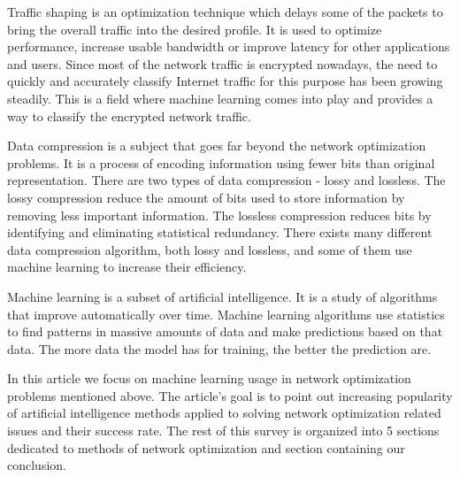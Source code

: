 \documentclass[conference]{IEEEtran}
\begin{document}
Traffic shaping is an optimization technique which delays some of the packets to bring the overall traffic into the desired profile. It is used to optimize performance, increase usable bandwidth or improve latency for other applications and users. Since most of the network traffic is encrypted nowadays, the need to quickly and accurately classify Internet traffic for this purpose has been growing steadily\cite{traffic-classification1}. This is a field where machine learning comes into play and provides a way to classify the encrypted network traffic.\par
Data compression is a subject that goes far beyond the network optimization problems. It is a process of encoding information using fewer bits than original representation. There are two types of data compression - lossy and lossless. The lossy compression reduce the amount of bits used to store information by removing less important information. The lossless compression reduces bits by identifying and eliminating statistical redundancy. There exists many different data compression algorithm, both lossy and lossless, and some of them use machine learning to increase their efficiency\cite{compression1}\cite{compression2}.\par
Machine learning is a subset of artificial intelligence. It is a study of algorithms that improve automatically over time. Machine learning algorithms use statistics to find patterns in massive amounts of data and make predictions based on that data. The more data the model has for training, the better the prediction are.\par
In this article we focus on machine learning usage in network optimization problems mentioned above. The article's goal is to point out increasing popularity of artificial intelligence methods applied to solving network optimization related issues and their success rate. The rest of this survey is organized into 5 sections dedicated to methods of network optimization and section containing our conclusion.
\end{document}
